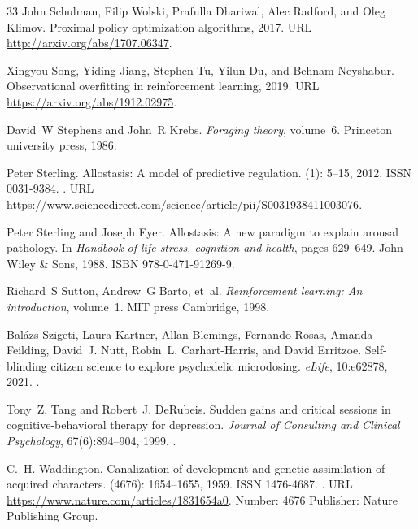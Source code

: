 \documentclass[12pt,fleqn]{article}
\begin{document}
\begin{thebibliography}{33}
  John Schulman, Filip Wolski, Prafulla Dhariwal, Alec Radford, and Oleg Klimov.
  \newblock Proximal policy optimization algorithms, 2017.
  \newblock URL \url{http://arxiv.org/abs/1707.06347}.

  Xingyou Song, Yiding Jiang, Stephen Tu, Yilun Du, and Behnam Neyshabur.
  \newblock Observational overfitting in reinforcement learning, 2019.
  \newblock URL \url{https://arxiv.org/abs/1912.02975}.

  David~W Stephens and John~R Krebs.
  \newblock \emph{Foraging theory}, volume~6.
  \newblock Princeton university press, 1986.

  Peter Sterling.
  \newblock Allostasis: A model of predictive regulation.
   (1): 5--15, 2012.
  \newblock ISSN 0031-9384.
  \newblock {}.
  \newblock URL
  \url{https://www.sciencedirect.com/science/article/pii/S0031938411003076}.

  Peter Sterling and Joseph Eyer.
  \newblock Allostasis: A new paradigm to explain arousal pathology.
  \newblock In \emph{Handbook of life stress, cognition and health}, pages
  629--649. John Wiley \& Sons, 1988.
  \newblock ISBN 978-0-471-91269-9.

  Richard~S Sutton, Andrew~G Barto, et~al.
  \newblock \emph{Reinforcement learning: An introduction}, volume~1.
  \newblock MIT press Cambridge, 1998.

  Balázs Szigeti, Laura Kartner, Allan Blemings, Fernando Rosas, Amanda
  Feilding, David~J. Nutt, Robin~L. Carhart-Harris, and David Erritzoe.
  \newblock Self-blinding citizen science to explore psychedelic microdosing.
  \newblock \emph{eLife}, 10:e62878, 2021.
  \newblock {}.

  Tony~Z. Tang and Robert~J. DeRubeis.
  \newblock Sudden gains and critical sessions in cognitive-behavioral therapy
  for depression.
  \newblock \emph{Journal of Consulting and Clinical Psychology},
  67(6):894--904, 1999.
  \newblock {}.

  C.~H. Waddington.
  \newblock Canalization of development and genetic assimilation of acquired
  characters.
   (4676): 1654--1655, 1959.
  \newblock ISSN 1476-4687.
  \newblock {}.
  \newblock URL \url{https://www.nature.com/articles/1831654a0}.
  \newblock Number: 4676 Publisher: Nature Publishing Group.


\end{thebibliography}
\end{document}
